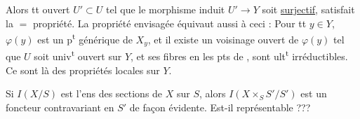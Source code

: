  Alors tt  ouvert $U'\subset U$ tel que le morphisme induit $U'\to Y$ soit \uline{surjectif}, satisfait la $=$ propriété.
La propriété envisagée équivaut aussi à ceci : Pour tt $y\in Y$, $\varphi(y)$ est un p\textsuperscript{t} générique  de $X_y$, et il existe un  voisinage ouvert de $\varphi(y)$ tel que  $U$ soit univ\textsuperscript{t} ouvert sur $Y$, et  ses fibres en les pts de , sont ult\textsuperscript{t} irréductibles. Ce sont là des propriétés locales sur $Y$.

Si $I(X/S)$ est l'ens des sections  de $X$ sur $S$, alors $I(X\times_S S'/S')$ est un foncteur contravariant en $S'$ de façon évidente. Est-il représentable ???

